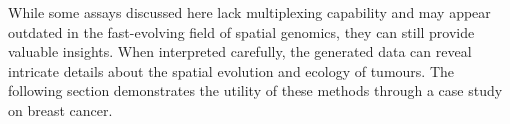 While some assays discussed here lack multiplexing capability and may appear outdated in the fast-evolving field of spatial genomics, they can still provide valuable insights. When interpreted carefully, the generated data can reveal intricate details about the spatial evolution and ecology of tumours. The following section  demonstrates the utility of these methods through a case study on breast cancer.